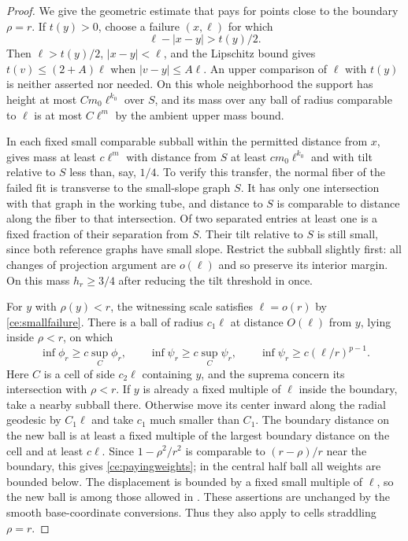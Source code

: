 \begin{proof}
We give the geometric estimate that pays for points close to the
boundary $\rho=r$.  If $t(y)>0$, choose a failure $(x,\ell)$ for
which
\begin{equation}
 \label{ce:witness}
 \ell-|x-y|>t(y)/2.
\end{equation}
Then $\ell>t(y)/2$, $|x-y|<\ell$, and the Lipschitz bound gives
$t(v)\le(2+A)\ell$ when $|v-y|\le A\ell$.  An upper comparison
of $\ell$ with $t(y)$ is neither asserted nor needed.  On this whole
neighborhood the support has height at most $Cm_0\ell^{k_0}$ over
$S$, and its mass over any ball of radius comparable to $\ell$ is
at most $C\ell^m$ by the ambient upper mass bound.

In each fixed small comparable subball within the permitted distance
from $x$,  gives mass at least $c\ell^m$ with
distance from $S$ at least $cm_0\ell^{k_0}$ and with tilt relative
to $S$ less than, say, $1/4$.  To verify this transfer, the normal
fiber of the failed fit is transverse to the small-slope graph $S$.
It has only one intersection with that graph in the working tube,
and distance to $S$ is comparable to distance along the fiber to
that intersection.  Of two separated entries at least one is a
fixed fraction of their separation from $S$.  Their tilt relative
to $S$ is still small, since both reference graphs have small slope.
Restrict the subball slightly first: all changes of projection
argument are $o(\ell)$ and so preserve its interior margin.  On
this mass $h_r\ge3/4$ after reducing the tilt threshold in
 once.

For $y$ with $\rho(y)<r$, the witnessing scale satisfies $\ell=o(r)$
by \eqref{ce:smallfailure}.  There is a ball of radius $c_1\ell$
at distance $O(\ell)$ from $y$, lying inside $\rho<r$, on which
\begin{equation}
 \label{ce:payingweights}
 \inf\phi_r\ge c\sup_C\phi_r,
 \qquad \inf\psi_r\ge c\sup_C\psi_r,
 \qquad \inf\psi_r\ge c(\ell/r)^{p-1}.
\end{equation}
Here $C$ is a cell of side $c_2\ell$ containing $y$, and the
suprema concern its intersection with $\rho<r$.  If $y$ is already
a fixed multiple of $\ell$ inside the boundary, take a nearby
subball there.  Otherwise move its center inward along the radial
geodesic by $C_1\ell$ and take $c_1$ much smaller than $C_1$.
The boundary distance on the new ball is at least a fixed multiple
of the largest boundary distance on the cell and at least
$c\ell$.  Since
$1-\rho^2/r^2$ is comparable to $(r-\rho)/r$ near the boundary,
this gives \eqref{ce:payingweights}; in the central half ball all
weights are bounded below.  The displacement is bounded by a
fixed small multiple of $\ell$, so the new ball is among those
allowed in .  These assertions are unchanged by
the smooth base-coordinate conversions.  Thus they also apply to
cells straddling $\rho=r$.


\end{proof}
